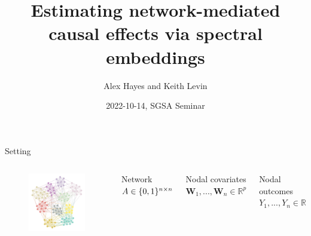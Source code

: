 \documentclass{beamer}
\title{Estimating network-mediated causal effects via spectral embeddings}
\date{2022-10-14, SGSA Seminar}
\author{Alex Hayes and Keith Levin}
\institute{University of Wisconsin-Madison}
\theoremstyle{remark}
\newcommand{\W}{\bm W}
\newcommand \R {\mathbb{R}}
\DeclarePairedDelimiter{\set}{\{}{\}}
\begin{document}
\maketitle

\begin{frame}{Setting}
    \begin{columns}

        \begin{figure}
            \includegraphics[width=\textwidth]{figures/assortative.png}
        \end{figure}


        Network $A \in \set{0, 1}^{n \times n}$

        Nodal covariates $\W_1, ..., \W_n \in \R^{p}$

        Nodal outcomes $Y_1, ..., Y_n \in \R$

    \end{columns}
\end{frame}
\end{document}
